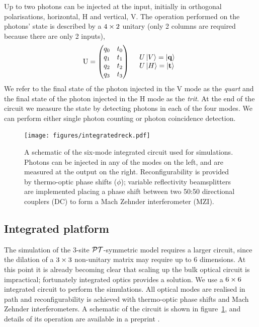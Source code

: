 Up to two photons can be injected at the input, initially in orthogonal
polarisations, horizontal, H and vertical, V. The operation performed on the
photons' state is described by a \(4 \times 2\) unitary (only 2 columns are
required because there are only 2 inputs),
\begin{align}
  \mathrm{U} = \begin{pmatrix}
    q_{0} & t_{0} \\
    q_{1} & t_{1} \\
    q_{2} & t_{2} \\
    q_{3} & t_{3}
  \end{pmatrix} && \begin{array}{l}
    U \left|V\right\rangle = \left|\mathbf{q}\right\rangle \\
    U \left|H\right\rangle = \left|\mathbf{t}\right\rangle
  \end{array}
\end{align}
We refer to the final state of the photon injected in the V mode as
the \emph{quart} and the final state of the photon injected in the H
mode as the \emph{trit}. At the end of the circuit we measure the state by
detecting photons in each of the four modes. We can perform either single photon
counting or photon coincidence detection.

\begin{figure}[h]
  \centering
  \texttt{[image: figures/integratedreck.pdf]}
  \caption[Schematic of the integrated circuit used for simulations]
  {A schematic of the six-mode integrated circuit used for simulations. Photons
  can be injected in any of the modes on the left, and are measured at the
  output on the right. Reconfigurability is provided by thermo-optic phase
  shifts (\(\phi\)); variable reflectivity beamsplitters are implemented placing
  a phase shift between two 50:50 directional couplers (DC) to form a Mach
  Zehnder interferometer (MZI).}
  \label{fig:IC}
\end{figure}

\subsection{Integrated platform}
The simulation of the 3-site \(\mathcal{PT}\)-symmetric model requires a larger circuit,
since the dilation of a \(3 \times 3\) non-unitary matrix may require up to 6
dimensions. At this point it is already becoming clear that scaling up the bulk
optical circuit is impractical; fortunately integrated optics provides a
solution. We use a \(6 \times 6\) integrated circuit to perform the simulations.
All optical modes are realised in path and reconfigurability is achieved with
thermo-optic phase shifts and Mach Zehnder interferometers. A schematic of the
circuit is shown in figure~\ref{fig:IC}, and details of its operation are
available in a preprint \cite{bigreck}.

